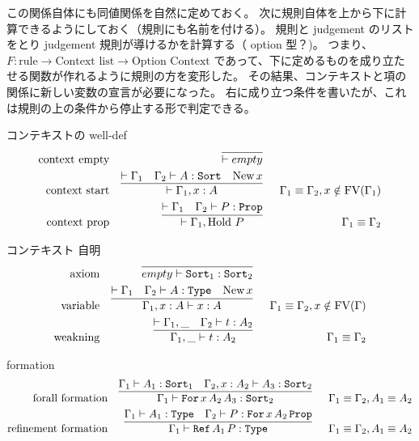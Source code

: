 この関係自体にも同値関係を自然に定めておく。
次に規則自体を上から下に計算できるようにしておく（規則にも名前を付ける）。
規則と judgement のリストをとり judgement 規則が導けるかを計算する（ option 型？)。
つまり、 \(F : \text{rule} \to \text{Context list} \to \text{Option Context}\) であって、下に定めるものを成り立たせる関数が作れるように規則の方を変形した。
その結果、コンテキストと項の関係に新しい変数の宣言が必要になった。
右に成り立つ条件を書いたが、これは規則の上の条件から停止する形で判定できる。

\begin{itembox}[l]{コンテキストの well-def}
\begin{align*}
  \text{context empty} &&
  \infer[]{\vdash empty}{} \\
  \text{context start} &&
  \infer[]{
    \vdash \Gamma_1 , x : A}{\vdash \Gamma_1 & \Gamma_2 \vdash A : \texttt{Sort} & \text{New} \, x
  } && \Gamma_1 \equiv \Gamma_2 , x \notin \text{FV}(\Gamma_1) \\
  \text{context prop} &&
  \infer[]{
    \vdash \Gamma_1 , \text{Hold } P}{\vdash \Gamma_1 & \Gamma_2 \vdash P : \texttt{Prop}
  } && \Gamma_1 \equiv \Gamma_2
\end{align*}
\end{itembox}

\begin{itembox}[l]{コンテキスト 自明}
\begin{align*}
  \text{axiom} &&
  \infer[]{empty \vdash \texttt{Sort}_1 : \texttt{Sort}_2}{} \\
  \text{variable} &&
  \infer[]{
    \Gamma_1 , x : A \vdash x : A}{\vdash \Gamma_1 & \Gamma_2 \vdash A : \texttt{Type} & \text{New} \, x
  } && \Gamma_1 \equiv \Gamma_2 , x \notin \text{FV}(\Gamma) \\
  \text{weakning} &&
  \infer[]{
    \Gamma_1 , \_ \vdash t : A_2}{\vdash \Gamma_1 , \_ & \Gamma_2 \vdash t : A_2
  } && \Gamma_1 \equiv \Gamma_2 
\end{align*}
\end{itembox}

\begin{itembox}[l]{formation}
\begin{align*}
  \text{forall formation} &&
  \infer[]{
    \Gamma_1 \vdash \texttt{For} \, x \, A_2 \, A_3 : \texttt{Sort}_2}{\Gamma_1 \vdash A_1 : \texttt{Sort}_1 & \Gamma_2 , x : A_2 \vdash A_3 : \texttt{Sort}_2
  } && \Gamma_1 \equiv \Gamma_2 , A_1 \equiv A_2 \\
  \text{refinement formation} &&
  \infer[]{
    \Gamma_1 \vdash \texttt{Ref} \, A_1 \, P : \texttt{Type}}{\Gamma_1 \vdash A_1 : \texttt{Type} & \Gamma_2 \vdash P : \texttt{For} \, x \, A_2 \, \texttt{Prop}
  } && \Gamma_1 \equiv \Gamma_2 , A_1 \equiv A_2
\end{align*}
\end{itembox}

